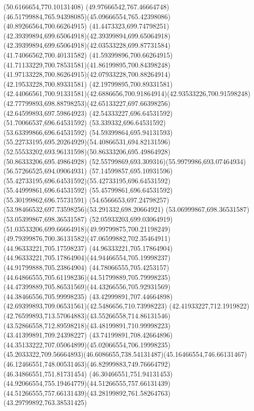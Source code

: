 {{	\lineto(50.6166654,770.10131408)
	\curveto(49.97666542,767.46664748)(46.51799884,765.94398085)(45.09666554,765.42398086)
	\closepath
	\moveto(40.89266564,700.66264915)
	\curveto(41.4473323,699.74798251)(42.39399894,699.65064918)(42.39399894,699.65064918)
	\curveto(42.39399894,699.65064918)(42.03533228,699.87731584)(41.74066562,700.40131582)
	\curveto(41.59399896,700.66264915)(41.71133229,700.78531581)(41.86199895,700.84398248)
	\curveto(41.97133228,700.86264915)(42.07933228,700.88264914)(42.19533228,700.89331581)
	\lineto(42.19799895,700.89331581)
	\curveto(42.44066561,700.91331581)(42.6886656,700.91864914)(42.93533226,700.91598248)
	\curveto(42.77799893,698.88798253)(42.65133227,697.66398256)(42.64599893,697.59864923)
	\lineto(42.54333227,696.64531592)
	\lineto(51.70066537,696.64531592)
	\lineto(53.339332,696.64531592)
	\lineto(53.63399866,696.64531592)
	\curveto(54.59399864,695.94131593)(55.22733195,695.20264929)(54.40866531,694.82131596)
	\curveto(52.55533202,693.96131598)(50.86333206,695.49864928)(50.86333206,695.49864928)
	\curveto(52.55799869,693.309316)(55.9979986,693.07464934)(56.57266525,694.09064931)
	\curveto(57.14599857,695.10931596)(55.42733195,696.64531592)(55.42733195,696.64531592)
	\lineto(55.44999861,696.64531592)
	\lineto(55.45799861,696.64531592)
	\lineto(55.30199862,696.75731591)
	\curveto(54.6566653,697.24798257)(53.98466532,697.73598256)(53.291332,698.20664921)
	\lineto(53.06999867,698.36531587)
	\lineto(53.05399867,698.36531587)
	\curveto(52.05933203,699.03064919)(51.03533206,699.66664918)(49.99799875,700.21198249)
	\curveto(49.79399876,700.36131582)(47.06599882,702.35464911)(44.96333221,705.17598237)
	\lineto(44.96333221,705.17864904)
	\curveto(44.96333221,705.17864904)(44.94466554,705.19998237)(44.91799888,705.23864904)
	\curveto(44.78066555,705.4253157)(44.64866555,705.61198236)(44.51799889,705.79998235)
	\curveto(44.47399889,705.86531569)(44.43266556,705.92931569)(44.38466556,705.99998235)
	\curveto(43.42999891,707.44664898)(42.69399893,709.06531561)(42.5486656,710.73998223)
	\curveto(42.41933227,712.1919822)(42.76599893,713.57064883)(43.55266558,714.86131546)
	\curveto(43.52866558,712.89598218)(43.48199891,710.99998223)(43.41399891,709.24398227)
	\curveto(43.74199891,708.42664896)(44.35133222,707.05064899)(45.02066554,706.19998235)
	\curveto(45.2033322,709.56664893)(46.6086655,738.54131487)(45.16466554,746.66131467)
	\curveto(46.12466551,748.00531463)(46.82999883,749.76664792)(46.34866551,751.81731454)
	\curveto(46.30466551,751.94131453)(44.92066554,755.19464779)(44.51266555,757.66131439)
	\curveto(44.51266555,757.66131439)(43.28199892,761.58264763)(43.29799892,763.38531425)
}}
